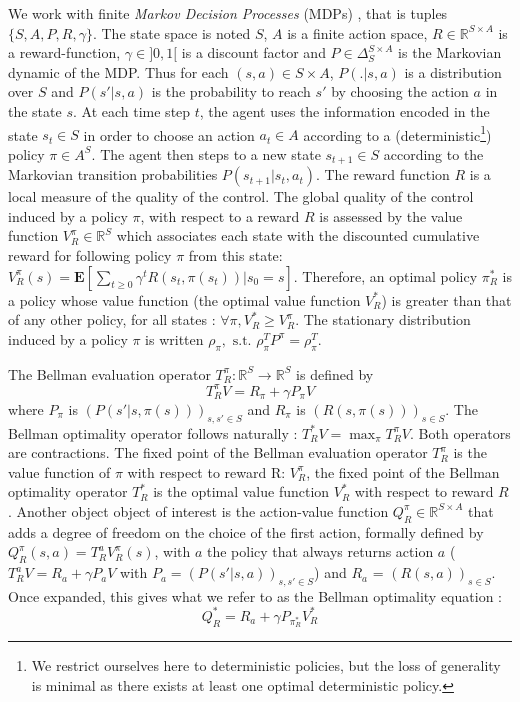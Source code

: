 \documentclass[smallextended]{svjour3}
\newcommand{\E}{\mathbf{E}}
\begin{document}
We work with finite \emph{Markov Decision Processes} (MDPs) \cite{puterman1994markov}, that is tuples $\{S,A,P,R,\gamma\}$. The state space is noted $S$, $A$ is a finite action space, $R\in\mathbb{R}^{S\times A}$ is a reward-function, $\gamma\in ]0,1[$ is a discount factor and $P\in \Delta_{S}^{S\times A}$ is the Markovian dynamic of the MDP. Thus for each $(s,a)\in S\times A$, $P(.|s,a)$ is a distribution over $S$ and $P(s'|s,a)$ is the probability to reach $s'$ by choosing the action $a$ in the state $s$. At each time step $t$, the agent uses the information encoded in the state $s_t\in S$ in order to choose an action $a_t \in A$ according to a (deterministic\footnote{We restrict ourselves here to deterministic policies, but the loss of generality is minimal as there exists at least one optimal deterministic policy.}) policy $\pi\in A^S$. The agent then steps to a new state $s_{t+1}\in S$ according to the Markovian transition probabilities $P(s_{t+1}|s_t,a_t)$. The reward function $R$ is a local measure of the quality of the control. The global quality of the control induced by a policy $\pi$, with respect to a reward $R$ is assessed by the value function $V^\pi_R \in \mathbb{R}^{S}$ which associates each state with the discounted cumulative reward for following policy $\pi$ from this state: $V^\pi_R(s) = \E[\sum_{t\geq 0}\gamma^tR(s_t,\pi(s_t))|s_0 = s]$. Therefore, an optimal policy $\pi^*_R$ is a policy whose value function (the optimal value function $V^*_R$) is greater than that of any other policy, for all states : $\forall \pi, V^*_R\geq V^\pi_R$. The stationary distribution induced by a policy $\pi$ is written $\rho_\pi,\textrm{ s.t. }\rho_\pi^TP^\pi = \rho_\pi^T$.

The Bellman evaluation operator $T^\pi_R: \mathbb{R}^{S} \rightarrow  \mathbb{R}^{S}$ is defined by
\begin{equation}
  T^{\pi}_RV = R_\pi + \gamma P_\pi V
  \end{equation}
where $P_\pi$ is $(P(s'|s,\pi(s)))_{s,s' \in S}$ and $R_\pi$ is $(R(s,\pi(s)))_{s\in S}$. The Bellman optimality operator follows naturally : $T^*_RV = \max_\pi T^\pi_RV$. Both operators are contractions. The fixed point of the Bellman evaluation operator $T^\pi_R$ is the value function of $\pi$ with respect to reward R: $V^\pi_R$, the fixed point of the Bellman optimality operator $T^*_R$ is the optimal value function $V_R^*$ with respect to reward $R$. Another object object of interest is the action-value function $Q^\pi_R\in\mathbb{R}^{S\times A}$ that adds a degree of freedom on the choice of the first action, formally defined by $Q^\pi_R(s,a) = T^a_RV^\pi_R(s)$, with $a$ the policy that always returns action $a$ ($T^a_RV = R_a + \gamma P_a V$ with $P_a = (P(s'|s,a))_{s,s' \in S}$) and $R_a$ = $(R(s,a))_{s\in S}$. Once expanded, this gives what we refer to as the Bellman optimality equation :
\begin{equation}
  Q^*_R = R_a + \gamma P_{\pi^*_R}V^*_R
  \label{eq:bellman1}
\end{equation}
\end{document}
